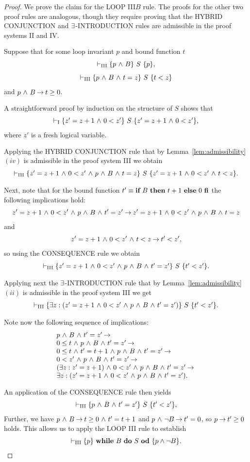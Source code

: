 \documentclass[manuscript, screen, review]{acmart}
\begin{document}
\begin{proof}
  We prove the claim for the LOOP III$B$ rule. The proofs for the
  other two proof rules are analogous, though they require proving
  that the HYBRID CONJUNCTION and $\te$-INTRODUCTION rules are
  admissible in the proof systems II and IV.

  Suppose that for some loop invariant $p$ and bound function $t$
\[
\vdash_{\rm{III}}  \HT{p \A B}{S}{p},
\]
\[
\vdash_{\rm{III}}  \HT{p \A B \A t=z}{S}{t<z}
\]
and
$p \A B \ra t \geq 0$.

A straightforward proof by induction on the structure of $S$
shows that
\[
\vdash_{\rm{I}}  \HT{z' = z+1 \A 0 < z'}{S}{z' = z+1 \A 0 < z'},
\]
where $z'$ is a fresh logical variable.

Applying the HYBRID CONJUNCTION rule that by Lemma~\ref{lem:admissibility}$(iv)$
is admissible in the proof system III
we obtain
\[
  \vdash_{\rm{III}}  \HT{z' = z+1 \A 0 < z' \A p \A B \A t=z}{S}{z' = z+1 \A 0 < z' \A t<z}.
\]

Next, note that for the bound function $t' \equiv \ITE{B}{t+1}{0}$
the following implications hold:
\[
  z' = z+1 \A 0 < z' \A p \A B \A t'=z' \ra
    z' = z+1 \A 0 < z' \A p \A B \A t=z
\]
and
\[
  z' = z+1 \A 0 < z' \A t<z \ra t' < z',
\]
so using the CONSEQUENCE rule we obtain
\[
  \vdash_{\rm{III}}  \HT{z' = z+1 \A 0 < z' \A p \A B \A t'=z'}{S}{t'<z'}.
\]

Applying next the $\te$-INTRODUCTION rule that by Lemma~\ref{lem:admissibility}$(ii)$
is admissible in the proof system III we get
\[
  \vdash_{\rm{III}}  \HT{\te z: (z' = z+1 \A 0 < z' \A p \A B \A t'=z')}{S}{t'<z'}.
\]

Note now the following sequence of implications:
\[
  \begin{array}{l}
    p \A B \A t'=z' \ra \\
    0 \leq t \A p \A B \A t'=z' \ra \\
    0 \leq t \A t' = t+1 \A p \A B \A t'=z' \ra \\
    0 < z' \A p \A B \A t'=z' \ra \\
    (\te z: z' = z+1) \A 0 < z' \A p \A B \A t'=z'  \ra \\
    \te z: (z' = z+1 \A 0 < z' \A p \A B \A t'=z'). 
  \end{array}
\]

An application of the CONSEQUENCE rule then yields
\[
\vdash_{\rm{III}}  \HT{p \A B \A t'=z'}{S}{t'<z'},
\]
Further, we have $p \A B \ra t \geq 0 \A t' = t+1$ and 
$p \A \neg B \ra t' = 0$, so 
$p \ra t' \geq 0$ holds.
This allows us to apply the LOOP III rule to establish
\[
\vdash_{\rm{III}}  \HT{p}{\WDD{B}{S}}{p \wedge \neg B}.
\]
\HB  
\end{proof}

%
\end{document}
